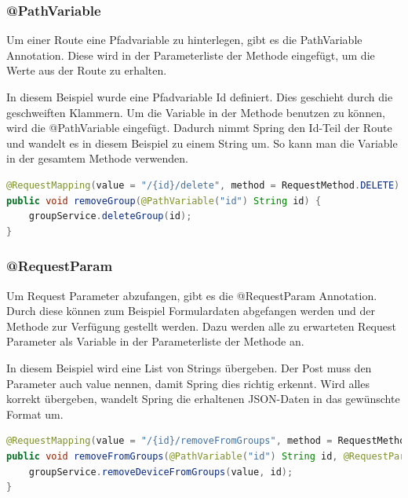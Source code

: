 \subsubsection{@PathVariable}
Um einer Route eine Pfadvariable zu hinterlegen, gibt es die PathVariable Annotation. Diese wird in der Parameterliste der Methode eingefügt, um die Werte aus der Route zu erhalten.

In diesem Beispiel wurde eine Pfadvariable Id definiert. Dies geschieht durch die geschweiften Klammern. Um die Variable in der Methode benutzen zu können, wird die @PathVariable eingefügt. Dadurch nimmt Spring den Id-Teil der Route und wandelt es in diesem Beispiel zu einem String um. So kann man die Variable in der gesamtem Methode verwenden.
\begin{lstlisting}[language=java]
@RequestMapping(value = "/{id}/delete", method = RequestMethod.DELETE)
public void removeGroup(@PathVariable("id") String id) {
	groupService.deleteGroup(id);
}
\end{lstlisting}
\subsubsection{@RequestParam}
Um Request Parameter abzufangen, gibt es die @RequestParam Annotation. Durch diese können zum Beispiel Formulardaten abgefangen werden und der Methode zur Verfügung gestellt werden. Dazu werden alle zu erwarteten Request Parameter als Variable in der Parameterliste der Methode an.

In diesem Beispiel wird eine List von Strings übergeben. Der Post muss den Parameter auch value nennen, damit Spring dies richtig erkennt. Wird alles korrekt übergeben, wandelt Spring die erhaltenen JSON-Daten in das gewünschte Format um.
\begin{lstlisting}[language=java]
@RequestMapping(value = "/{id}/removeFromGroups", method = RequestMethod.POST)
public void removeFromGroups(@PathVariable("id") String id, @RequestParam("value") List<String> value) {
	groupService.removeDeviceFromGroups(value, id);
}
\end{lstlisting}
